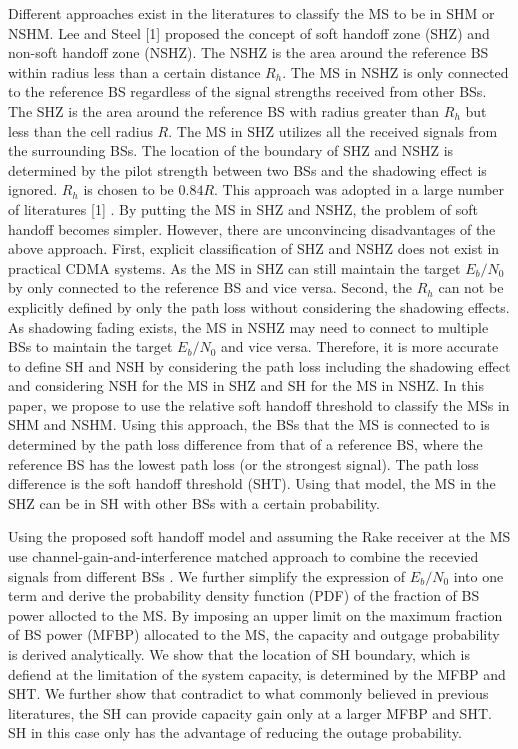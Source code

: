 Different approaches exist in the literatures to classify the MS
to be in SHM or NSHM. Lee and Steel [1] proposed the concept of
soft handoff zone (SHZ) and non-soft handoff zone (NSHZ). The NSHZ
is the area around the reference BS within radius less than a
certain distance $R_h$. The MS in NSHZ is only connected to the
reference BS regardless of the signal strengths received from
other BSs. The SHZ is the area around the reference BS with radius
greater than $R_h$ but less than the cell radius $R$. The MS in
SHZ utilizes all the received signals from the surrounding BSs.
The location of the boundary of SHZ and NSHZ is determined by the
pilot strength between two BSs and the shadowing effect is
ignored. $R_h$ is chosen to be $0.84R$. This approach was adopted
in a large number of literatures [1] . By putting the MS in SHZ
and NSHZ, the problem of soft handoff becomes simpler. However,
there are unconvincing disadvantages of the above approach. First,
explicit classification of SHZ and NSHZ does not exist in
practical CDMA systems. As the MS in SHZ can still maintain the
target $E_b/N_0$ by only connected to the reference BS and vice
versa. Second, the $R_h$ can not be explicitly defined by only the
path loss without considering the shadowing effects. As shadowing
fading exists, the MS in NSHZ may need to connect to multiple BSs
to maintain the target $E_b/N_0$ and vice versa. Therefore, it is
more accurate to define SH and NSH by considering the path loss
including the shadowing effect and considering NSH for the MS in
SHZ and SH for the MS in NSHZ. In this paper, we propose to use
the relative soft handoff threshold to classify the MSs in SHM and
NSHM. Using this approach, the BSs that the MS is connected to is
determined by the path loss difference from that of a reference
BS, where the reference BS has the lowest path loss (or the
strongest signal). The path loss difference is the soft handoff
threshold (SHT). Using that model, the MS in the SHZ can be in SH
with other BSs with a certain probability.

Using the proposed soft handoff model and assuming the Rake
receiver at the MS use channel-gain-and-interference matched
approach to combine the recevied signals from different BSs
.
We further simplify the expression of $E_b/N_0$ into one term and
derive the probability density function (PDF) of the fraction of
BS power allocted to the MS. By imposing an upper limit on the
maximum fraction of BS power (MFBP) allocated to the MS, the
capacity and outgage probability is derived analytically. We show
that the location of SH boundary, which is defiend at the
limitation of the system capacity, is
determined by the MFBP and SHT. We further show that contradict to
what commonly believed in previous literatures,
the SH can provide capacity gain only at a larger MFBP and SHT. SH
in this case only has the advantage of reducing the outage
probability.

